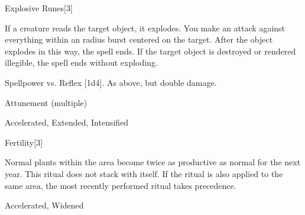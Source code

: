 \begin{spellsection}{Explosive Runes}[3]
\begin{spellcontent}
\begin{spelltargetinginfo}
\end{spelltargetinginfo}
\begin{spelleffects}
\spelleffect
If a creature reads the target object, it explodes.
You make an attack against everything within an \areamed radius burst centered on the target.
After the object explodes in this way, the spell ends.
If the target object is destroyed or rendered illegible, the spell ends without exploding.
\begin{spellattack}{Spellpower vs. Reflex}
\spellsuccess {}[1d4].
\spellcritical As above, but double damage.
\end{spellattack}
\spelldur Attunement (multiple)
\end{spelleffects}
\end{spellcontent}
\begin{spellfooter}
 Accelerated, Extended, Intensified
\end{spellfooter}
\begin{spellsubcontent}
\end{spellsubcontent}
\end{spellsection}
\begin{spellsection}{Fertility}[3]
\begin{spellcontent}
\begin{spelltargetinginfo}
\end{spelltargetinginfo}
\begin{spelleffects}
\spelleffect
Normal plants within the area become twice as productive as normal for the next year.
This ritual does not stack with itself.
If the  ritual is also applied to the same area, the most recently performed ritual takes precedence.
\end{spelleffects}
\end{spellcontent}
\begin{spellfooter}
 Accelerated, Widened
\end{spellfooter}
\begin{spellsubcontent}
\end{spellsubcontent}
\end{spellsection}
